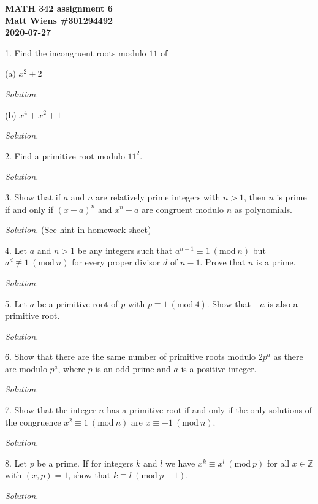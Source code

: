 \documentclass{article}
\newcommand{\Mod}[1]{\ (\mathrm{mod}\ #1)}
\newcommand{\Z}{\mathbb{Z}}
\begin{document}
\textbf{MATH 342 assignment 6} \\
\textbf{Matt Wiens \#301294492} \\
\textbf{2020-07-27}

1. Find the incongruent roots modulo $11$ of

(a) $x^2 + 2$

\textit{Solution.}

\vspace{5mm}

(b) $x^4 + x^2 + 1$

\textit{Solution.}

\newpage

2. Find a primitive root modulo $11^2$.

\textit{Solution.}

\newpage

3. Show that if $a$ and $n$ are relatively prime integers with $n > 1$,
then $n$ is prime if and only if $(x - a)^n$ and $x^n - a$ are congruent
modulo $n$ as polynomials.

\textit{Solution.}
(See hint in homework sheet)

\newpage

4. Let $a$ and $n > 1$ be any integers such that $a^{n - 1} \equiv 1 \Mod{n}$
but $a^d \not\equiv 1 \Mod{n}$ for every proper divisor $d$ of $n - 1$. Prove
that $n$ is a prime.

\textit{Solution.}

\newpage

5. Let $a$ be a primitive root of $p$ with $p \equiv 1 \Mod{4}$. Show
that $-a$ is also a primitive root.

\textit{Solution.}

\newpage

6. Show that there are the same number of primitive roots modulo $2p^a$
as there are modulo $p^a$, where $p$ is an odd prime and $a$ is a
positive integer.

\textit{Solution.}

\newpage

7. Show that the integer $n$ has a primitive root if and only if the
only solutions of the congruence $x^2 \equiv 1 \Mod{n}$ are
$x \equiv \pm 1 \Mod{n}$.

\textit{Solution.}

\newpage

8. Let $p$ be a prime. If for integers $k$ and $l$ we have
$x^k \equiv x^l \Mod{p}$ for all $x \in \Z$ with $(x, p) = 1$,
show that $k \equiv l \Mod{p - 1}$.

\textit{Solution.}

\newpage
\end{document}
